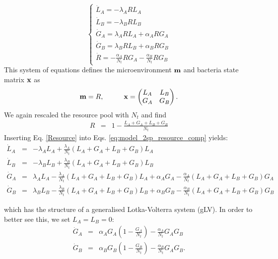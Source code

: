 \documentclass[10pt,A4paper]{article}
\begin{document}
\begin{equation}
    \begin{cases}
        \dot{L}_A = - \lambda_A R L_A\\
        \dot{L}_B = - \lambda_B R L_B \\
        \dot{G}_A = \lambda_A R L_A +\alpha_A R G_A\\
        \dot{G}_B = \lambda_B R L_B +\alpha_B R G_B\\
        \dot{R} =-\frac{\alpha_A}{N_t} R G_A-\frac{\alpha_B}{N_t} R G_B
    \end{cases}
    \label{eq:model_2sp_resource_comp}
\end{equation}
This system of equations defines the microenvironment $\mathbf{m}$ and bacteria state matrix $\mathbf{x}$ as
\begin{equation}
    \mathbf{m} = R, \hspace{1cm}
    \mathbf{x} = \begin{pmatrix}
        L_A & L_B \\
        G_A & G_B 
    \end{pmatrix}.
\end{equation}
We again rescaled the resource pool with $N_t$ and find
\begin{eqnarray}
\label{Resource}
R &=&1-\frac{L_A+G_A+L_B+G_B}{N_t}
\end{eqnarray}
Inserting Eq. \ref{Resource} into Eqs. \ref{eq:model_2sp_resource_comp} yields:
\begin{eqnarray*}
\dot{L}_A &=& - \lambda_A  L_A + \frac{\lambda_A}{N_t}\left(L_A+G_A+L_B+G_B\right )L_A\\
\dot{L}_B &=& - \lambda_B L_B + \frac{\lambda_B}{N_t}\left(L_A+G_A+L_B+G_B\right )L_B \\
\dot{G}_A &=&  \lambda_A  L_A - \frac{\lambda_A}{N_t}\left(L_A+G_A+L_B+G_B\right )L_A +\alpha_A G_A - \frac{\alpha_A}{N_t}\left(L_A+G_A+L_B+G_B\right )G_A\\
\dot{G}_B &=& \lambda_B L_B - \frac{\lambda_B}{N_t}\left(L_A+G_A+L_B+G_B\right )L_B  +\alpha_B G_B -\frac{\alpha_B}{N_t}\left(L_A+G_A+L_B+G_B\right )G_B
\end{eqnarray*}

which has the structure of a generalised Lotka-Volterra system (gLV). 
In order to better see this, we set $L_A=L_B=0$: 
\begin{eqnarray}
\label{Comp_Model}
\dot{G}_A &=& \alpha_A G_A\left(1 - \frac{G_A}{N_t}\right ) - \frac{\alpha_A}{N_t}G_AG_B\\
\dot{G}_B &=& \alpha_B G_B\left(1-\frac{G_B}{N_t}\right ) -\frac{\alpha_B}{N_t}G_AG_B. 
\label{eq:LV_simple}
\end{eqnarray} 
\end{document}
